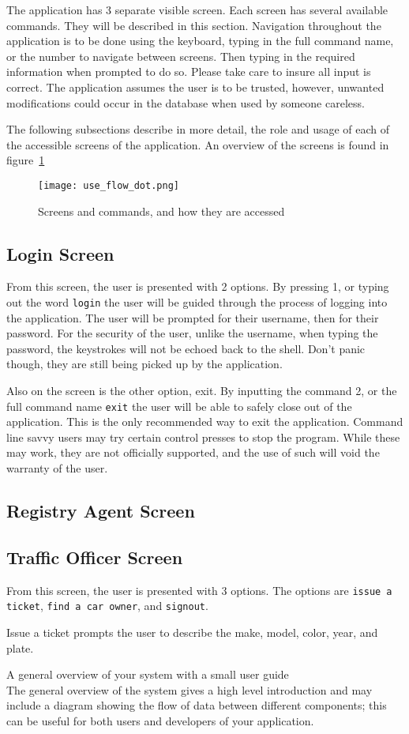 
The application has 3 separate visible screen. Each screen has several
available commands. They will be described in this section. Navigation
throughout the application is to be done using the keyboard, typing in the full
command name, or the number to navigate between screens. Then typing in the
required information when prompted to do so. Please take care to insure all
input is correct. The application assumes the user is to be trusted, however,
unwanted modifications could occur in the database when used by someone
careless.

The following subsections describe in more detail, the role and usage of each
of the accessible screens of the application. An overview of the screens is found in figure~\ref{fig:use_flow}

\begin{figure}
    \centering
    \texttt{[image: use\_flow\_dot.png]}
    \caption{Screens and commands, and how they are accessed}\label{fig:use_flow}
\end{figure}

\subsection{Login Screen}

From this screen, the user is presented with 2 options. By pressing 1, or
typing out the word \verb|login| the user will be guided through the process of
logging into the application. The user will be prompted for their username,
then for their password. For the security of the user, unlike the username,
when typing the password, the keystrokes will not be echoed back to the shell.
Don't panic though, they are still being picked up by the application.

Also on the screen is the other option, exit. By inputting the command 2, or
the full command name \verb|exit| the user will be able to safely close out of
the application. This is the only recommended way to exit the application.
Command line savvy users may try certain control presses to stop the program.
While these may work, they are not officially supported, and the use of such
will void the warranty of the user.

\subsection{Registry Agent Screen}


\subsection{Traffic Officer Screen}

From this screen, the user is presented with 3 options. The options are
\verb|issue a ticket|, \verb|find a car owner|, and \verb|signout|.

Issue a ticket prompts the user to describe the make, model, color, year, and plate.

A general overview of your system with a small user guide\\
The general overview of the system gives a high level introduction and may include a diagram showing the flow of data between different components; this can be useful for both users and developers of your application.

